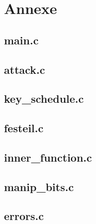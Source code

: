 \documentclass[11pt]{article}
\begin{document}
\newpage

\section{Annexe}

\subsection{main.c}

 \newpage

\subsection{attack.c} 

\label{attack.c}

\newpage

\subsection{key\_schedule.c} 

 \newpage

\subsection{festeil.c} 

 \newpage

\subsection{inner\_function.c} 

 \newpage

\subsection{manip\_bits.c} 

 \newpage

\subsection{errors.c} 

 \newpage
\end{document}
